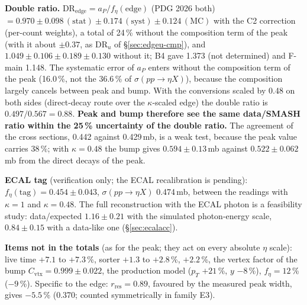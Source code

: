 \documentclass[11pt,a4paper]{article}
\newcommand{\code}[1]{\texttt{\detokenize{#1}}}
\newcommand{\aP}{\ensuremath{a_P}\xspace}
\newcommand{\feta}{\ensuremath{f_\eta}\xspace}
\newcommand{\sigeta}{\ensuremath{\sigma(pp\to\eta X)}\xspace}
\begin{document}
\textbf{Double ratio.} $\mathrm{DR}_{\mathrm{edge}}=\aP/f_\eta(\mathrm{edge})$ (PDG 2026 both) $=0.970\pm0.098\,(\mathrm{stat})\pm0.174\,(\mathrm{syst})
\pm0.124\,(\mathrm{MC})$ with the C2 correction (per-count weights), a total of 24\,\% without the composition term of the peak (with it about $\pm0.37$, as
DR$_u$ of \S\ref{sec:edgeu-cmp}), and $1.049\pm0.106\pm0.189\pm0.130$ without it; B4 gave 1.373 (not determined) and
F-main 1.148. The systematic error of \aP enters without the composition term of the peak (16.0\,\%, not the 36.6\,\% of \sigeta), because the composition largely
cancels between peak and bump. With the conversions scaled by 0.48 on both sides (direct-decay route over the $\kappa$-scaled edge) the double
ratio is $0.497/0.567=0.88$. \textbf{Peak and bump therefore see the same data/SMASH ratio within the 25\,\% uncertainty of the double ratio.} The
agreement of the cross sections, 0.442 against 0.429\,mb, is a weak test, because the peak value carries 38\,\%; with $\kappa=0.48$ the bump gives
$0.594\pm0.13$\,mb against $0.522\pm0.062$\,mb from the direct decays of the peak.

\textbf{ECAL tag} (verification only; the ECAL recalibration is pending): $f_\eta(\mathrm{tag})=0.454\pm0.043$, \sigeta 0.474\,mb, between the
readings with $\kappa=1$ and $\kappa=0.48$. The full reconstruction with the ECAL photon is a feasibility study: data/expected $1.16\pm0.21$ with
the simulated photon-energy scale, $0.84\pm0.15$ with a data-like one (\S\ref{sec:ecalacc}).

\textbf{Items not in the totals} (as for the peak; they act on every absolute $\eta$ scale): live time $+7.1$ to $+7.3$\,\%, sorter $+1.3$ to
$+2.8$\,\%, \code{cor_ok} $+2.2$\,\%, the vertex factor of the bump $C_{\mathrm{vtx}}=0.999\pm0.022$, the production model ($p_T$ $+21$\,\%, $y$
$-8$\,\%), $\feta=12$\,\% ($-9$\,\%). Specific to the edge: $r_{\mathrm{res}}=0.89$, favoured by the measured peak width, gives $-5.5$\,\% (0.370;
counted symmetrically in family E3).
\end{document}

